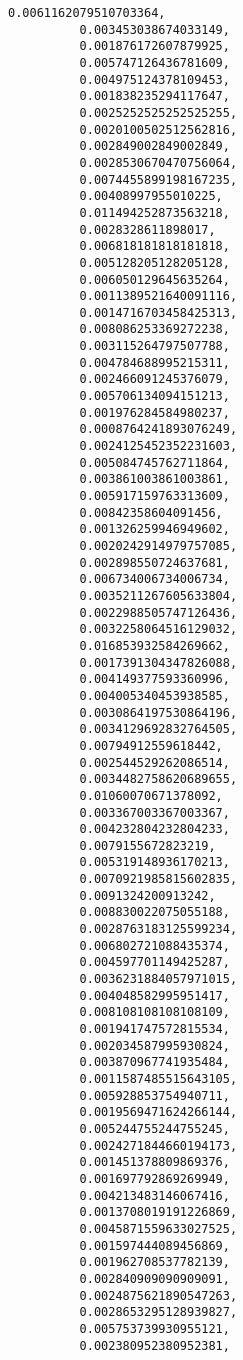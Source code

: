 \documentclass[11pt]{article}
\begin{document}
\begin{Verbatim}[commandchars=\\\{\}]
          0.0061162079510703364,
          0.003453038674033149,
          0.001876172607879925,
          0.005747126436781609,
          0.004975124378109453,
          0.001838235294117647,
          0.0025252525252525255,
          0.0020100502512562816,
          0.002849002849002849,
          0.0028530670470756064,
          0.0074455899198167235,
          0.00408997955010225,
          0.011494252873563218,
          0.0028328611898017,
          0.006818181818181818,
          0.005128205128205128,
          0.006050129645635264,
          0.0011389521640091116,
          0.0014716703458425313,
          0.008086253369272238,
          0.003115264797507788,
          0.004784688995215311,
          0.002466091245376079,
          0.005706134094151213,
          0.001976284584980237,
          0.0008764241893076249,
          0.0024125452352231603,
          0.005084745762711864,
          0.003861003861003861,
          0.005917159763313609,
          0.00842358604091456,
          0.001326259946949602,
          0.0020242914979757085,
          0.002898550724637681,
          0.006734006734006734,
          0.0035211267605633804,
          0.0022988505747126436,
          0.0032258064516129032,
          0.016853932584269662,
          0.0017391304347826088,
          0.004149377593360996,
          0.004005340453938585,
          0.0030864197530864196,
          0.0034129692832764505,
          0.00794912559618442,
          0.002544529262086514,
          0.0034482758620689655,
          0.01060070671378092,
          0.003367003367003367,
          0.004232804232804233,
          0.0079155672823219,
          0.005319148936170213,
          0.0070921985815602835,
          0.0091324200913242,
          0.008830022075055188,
          0.0028763183125599234,
          0.006802721088435374,
          0.004597701149425287,
          0.0036231884057971015,
          0.004048582995951417,
          0.008108108108108109,
          0.001941747572815534,
          0.002034587995930824,
          0.003870967741935484,
          0.0011587485515643105,
          0.005928853754940711,
          0.0019569471624266144,
          0.005244755244755245,
          0.0024271844660194173,
          0.001451378809869376,
          0.001697792869269949,
          0.004213483146067416,
          0.0013708019191226869,
          0.0045871559633027525,
          0.001597444089456869,
          0.001962708537782139,
          0.002840909090909091,
          0.0024875621890547263,
          0.0028653295128939827,
          0.005753739930955121,
          0.002380952380952381,

\end{Verbatim}
\end{document}
